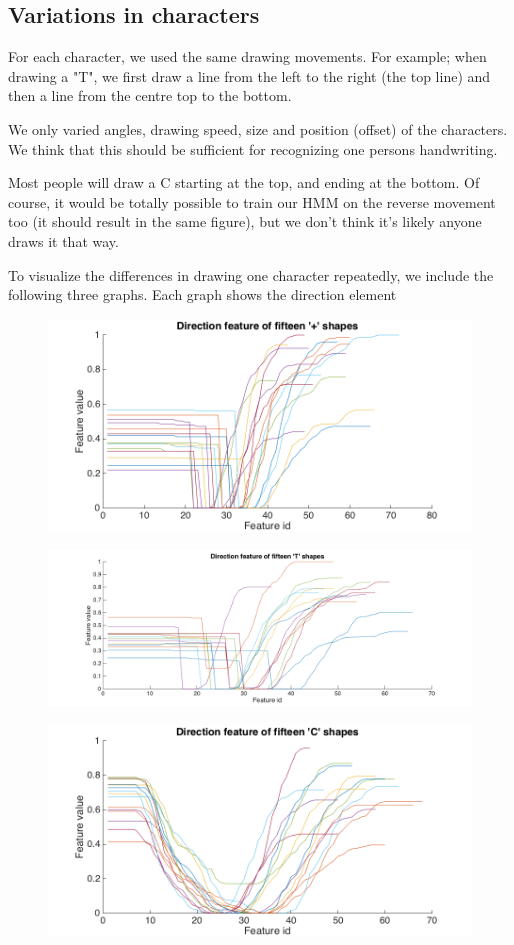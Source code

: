 \subsection{Variations in characters}
For each character, we used the same drawing movements. For example; when drawing a "T", we first draw a line from the left to the right (the top line) and then a line from the centre top to the bottom.

We only varied angles, drawing speed, size and position (offset) of the characters. We think that this should be sufficient for recognizing one persons handwriting.

Most people will draw a C starting at the top, and ending at the bottom. Of course, it would be totally possible to train our HMM on the reverse movement too (it should result in the same figure), but we don't think it's likely anyone draws it that way.

To visualize the differences in drawing one character repeatedly, we include the following three graphs. Each graph shows the direction element 

\begin{figure}[H]
	\centering
	\includegraphics[width=.95\linewidth]{images/direction_plots_+}
\end{figure}

\begin{figure}[H]
	\centering
	\includegraphics[width=.95\linewidth]{images/direction_plots_T}
\end{figure}

\begin{figure}[H]
	\centering
	\includegraphics[width=.95\linewidth]{images/direction_plots_C}
\end{figure}